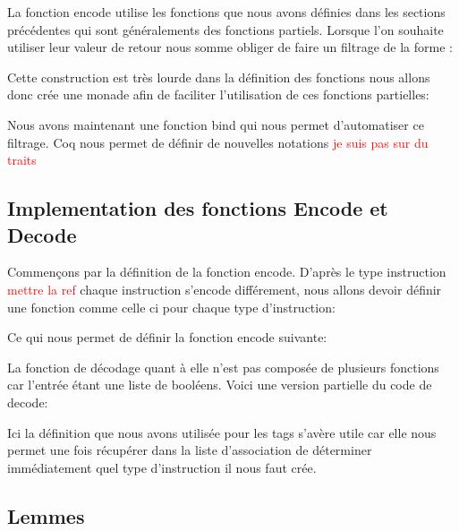 \documentclass {article}
\newcommand{\codefrom}[3]
           {}
\theoremstyle{definition}
\theoremstyle{remark}
\newcommand{\todo}[1]{\textcolor{red}{#1}}
\begin{document}
La fonction encode utilise les fonctions que nous avons définies dans les sections précédentes qui sont généralements
des fonctions partiels. Lorsque l'on souhaite utiliser leur valeur de retour nous somme obliger de faire un
filtrage de la forme :

\codefrom{rapport}{definitions}{pattern_matching}

Cette construction est très lourde dans la définition des fonctions nous allons donc crée une monade
afin de faciliter l'utilisation de ces fonctions partielles:

\codefrom{src}{encode}{monade}

Nous avons maintenant une fonction bind qui nous permet d'automatiser ce filtrage. Coq nous permet de
définir de nouvelles notations \todo{je suis pas sur du traits}

\codefrom{src}{encode}{notation}






\subsection{Implementation des fonctions Encode et Decode}

Commençons par la définition de la fonction encode. D'après le type instruction \todo{mettre la ref}
chaque instruction s'encode différement, nous allons devoir définir une fonction comme celle ci
pour chaque type d'instruction:

\codefrom{src}{encode}{encode_t_n}

Ce qui nous permet de définir la fonction encode suivante:

\codefrom{src}{encode}{encode}

La fonction de décodage quant à elle n'est pas composée de plusieurs fonctions car l'entrée
étant une liste de booléens.
Voici une version partielle du code de decode:

\codefrom{src}{encode}{decode}

Ici la définition que nous avons utilisée pour les tags s'avère utile car elle nous permet
une fois récupérer dans la liste d'association de déterminer immédiatement quel type
d'instruction il nous faut crée.





\subsection{Lemmes}
\end{document}
